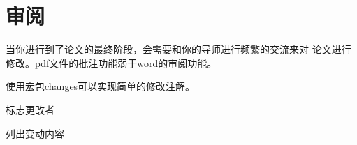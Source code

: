 \documentclass[supercite,fontset=windows]{../../upcthesis}
\begin{document}
\section{审阅}
当你进行到了论文的最终阶段，会需要和你的导师进行频繁的交流来对
论文进行修改。pdf文件的批注功能弱于word的审阅功能。


使用宏包changes可以实现简单的修改注解。


标志更改者



列出变动内容
\end{document}
